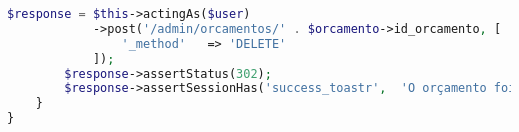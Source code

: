 \begin{lstlisting}[language=PHP, caption= Scripts de teste de Listagem e Deleção de Orçamentos, nolol,
label={code:ListagemEDelecaoDeOrcamentosTest}]
        $response = $this->actingAs($user)
            ->post('/admin/orcamentos/' . $orcamento->id_orcamento, [
                '_method'   => 'DELETE'
            ]);
        $response->assertStatus(302);
        $response->assertSessionHas('success_toastr',  'O orçamento foi excluído com sucesso!');
    }
}
\end{lstlisting}


